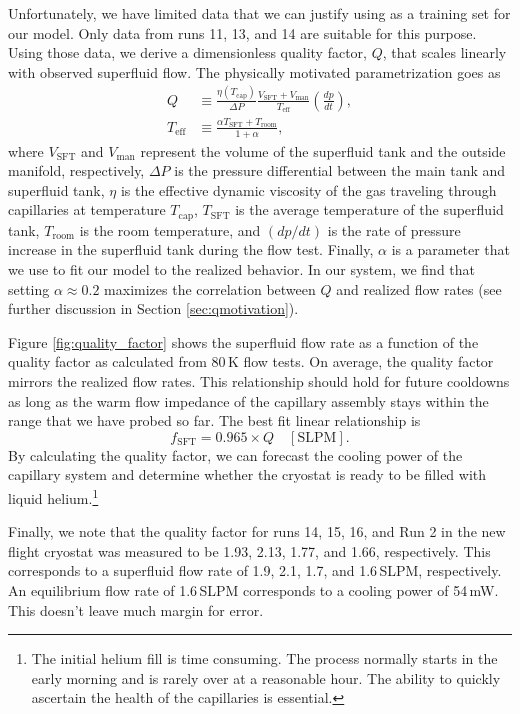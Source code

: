 \documentclass[
12pt, %
letterpaper, %
oneside, %
headinclude, footinclude, %
BCOR5mm, %
]{scrartcl}
\newcommand{\mrm}[1]{\mathrm{#1}}
\begin{document}
Unfortunately, we have limited data that we can justify using as a training set for our model. Only data from runs 11, 13, and 14 are suitable for this purpose. Using those data, we derive a dimensionless quality factor, $Q$, that scales linearly with observed superfluid flow. The physically motivated parametrization goes as
\begin{align}
Q &\equiv \frac{\eta (T_\mrm{cap})}{\Delta P} \frac{V_\mrm{SFT}+V_\mrm{man}}{T_\mrm{eff}} \left( \frac{d p}{d t} \right), \\
T_\mrm{eff} &\equiv \frac{\alpha T_\mrm{SFT}+T_\mrm{room}}{1+\alpha},
\end{align}
where $V_\mrm{SFT}$ and $V_\mrm{man}$ represent the volume of the superfluid tank and the outside manifold, respectively, $\Delta P$ is the pressure differential between the main tank and superfluid tank, $\eta$ is the effective dynamic viscosity of the gas traveling through capillaries at temperature $T_\mrm{cap}$, $T_\mrm{SFT}$ is the average temperature of the superfluid tank, $T_\mrm{room}$ is the room temperature, and $(d p/d t)$ is the rate of pressure increase in the superfluid tank during the flow test. Finally, $\alpha$ is a parameter that we use to fit our model to the realized behavior. In our system, we find that setting $\alpha \approx 0.2$ maximizes the correlation between $Q$ and realized flow rates (see further discussion in Section \ref{sec:qmotivation}).

Figure \ref{fig:quality_factor} shows the superfluid flow rate as a function of the quality factor as calculated from 80\,K flow tests. On average, the quality factor mirrors the realized flow rates. This relationship should hold for future cooldowns as long as the warm flow impedance of the capillary assembly stays within the range that we have probed so far. The best fit linear relationship is 
\begin{equation}
f_\mrm{SFT} = 0.965 \times Q \quad [\mrm{SLPM}].
\end{equation}
By calculating the quality factor, we can forecast the cooling power of the capillary system and determine whether the cryostat is ready to be filled with liquid helium.\footnote{The initial helium fill is time consuming. The process normally starts in the early morning and is rarely over at a reasonable hour. The ability to quickly ascertain the health of the capillaries is essential.}

Finally, we note that the quality factor for runs 14, 15, 16, and Run 2 in the new flight cryostat was measured to be 1.93, 2.13, 1.77, and 1.66, respectively. This corresponds to a superfluid flow rate of 1.9, 2.1, 1.7, and 1.6\,SLPM, respectively. An equilibrium flow rate of 1.6\,SLPM corresponds to a cooling power of 54\,mW. This doesn't leave much margin for error.
\end{document}
